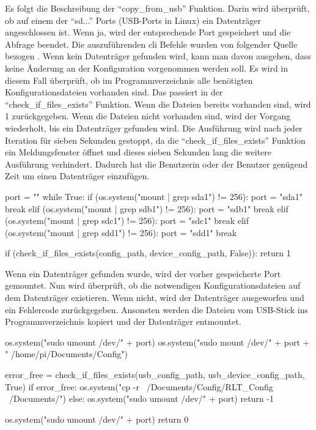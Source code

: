 Es folgt die Beschreibung der \enquote{copy\_from\_usb} Funktion. Darin wird überprüft, ob auf einem der \enquote{sd...} Ports (USB-Ports in Linux) ein Datenträger angeschlossen ist. Wenn ja, wird der entsprechende Port gespeichert und die Abfrage beendet. Die auszuführenden \acf{cli} Befehle wurden von folgender Quelle bezogen \cite{Rendek:2023}. Wenn kein Datenträger gefunden wird, kann man davon ausgehen, dass keine Änderung an der Konfiguration vorgenommen werden soll. Es wird in diesem Fall überprüft, ob im Programmverzeichnis alle benötigten Konfigurationsdateien vorhanden sind. Das passiert in der \enquote{check\_if\_files\_exists} Funktion. Wenn die Dateien bereits vorhanden sind, wird 1 zurückgegeben. Wenn die Dateien nicht vorhanden sind, wird der Vorgang wiederholt, bis ein Datenträger gefunden wird. Die Ausführung wird nach jeder Iteration für sieben Sekunden gestoppt, da die \enquote{check\_if\_files\_exists} Funktion ein Meldungsfenster öffnet und dieses sieben Sekunden lang die weitere Ausführung verhindert. Dadurch hat die Benutzerin oder der Benutzer genügend Zeit um einen Datenträger einzufügen.

\begin{pythoncode}
	port = ""
	while True:
		if (os.system("mount | grep sda1") != 256):
			port = "sda1"
			break
		elif (os.system("mount | grep sdb1") != 256):
			port = "sdb1"
			break
		elif (os.system("mount | grep sdc1") != 256):
			port = "sdc1"
			break
		elif (os.system("mount | grep sdd1") != 256):
			port = "sdd1"
			break
		
		if (check_if_files_exists(config_path, device_config_path, False)):
			return 1
\end{pythoncode}

Wenn ein Datenträger gefunden wurde, wird der vorher gespeicherte Port gemountet. Nun wird überprüft, ob die notwendigen Konfigurationsdateien auf dem Datenträger existieren. Wenn nicht, wird der Datenträger ausgeworfen und ein Fehlercode zurückgegeben. Ansonsten werden die Dateien vom USB-Stick ins Programmverzeichnis kopiert und der Datenträger entmountet. 
\begin{pythoncode}
	os.system("sudo umount /dev/" + port)
	os.system("sudo mount /dev/" + port + " /home/pi/Documents/Config")
	
	error_free = check_if_files_exists(usb_config_path, usb_device_config_path, True)
	if error_free:
		os.system("cp -r ~/Documents/Config/RLT_Config ~/Documents/")
	else:
		os.system("sudo umount /dev/" + port)
		return -1
		
	os.system("sudo umount /dev/" + port)
	return 0
\end{pythoncode}

